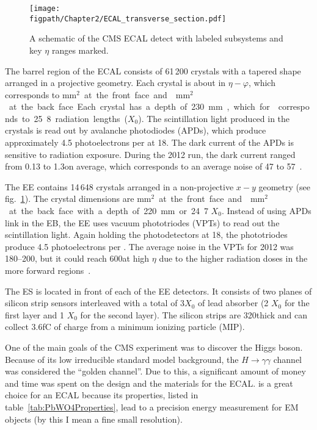 \begin{figure}[!hbt]
    \centering
    \texttt{[image: \\figpath/Chapter2/ECAL\_transverse\_section.pdf]}
    \caption{A schematic of the CMS ECAL detect with labeled subsystems and key $\eta$ ranges marked.}
    \label{fig:CMS_ECAL}
\end{figure}

The barrel region of the ECAL consists of 61\,200 crystals with a tapered shape arranged in a projective geometry. Each crystal is about  in $\eta-\varphi$, which corresponds to \unit{mm$^{\text{2}}$} at the front face and \unit{mm$^{\text{2}}$} at the back face. Each crystal has a depth of 230\mm, which for \PbWO corresponds to 25.8 radiation lengths ($X_{0}$). The scintillation light produced in the crystals is read out by avalanche photodiodes (APDs), which produce approximately 4.5 photoelectrons per \MeVns at 18\degC. The dark current of the APDs is sensitive to radiation exposure. During the 2012 run, the dark current ranged from 0.13 to 1.3\muA on average, which corresponds to an average noise of 47 to 57\mev~\cite{CMS:2013ecal}.

The EE contains 14\,648 \PbWO crystals arranged in a non-projective $x-y$ geometry (see fig.~\ref{fig:CMS_ECAL}). The crystal dimensions are \unit{mm$^{\text{2}}$} at the front face and \unit{mm$^{\text{2}}$} at the back face with a depth of 220\mm or 24.7 $X_{0}$. Instead of using APDs link in the EB, the EE uses vacuum phototriodes (VPTs) to read out the scintillation light. Again holding the photodetectors at 18\degC, the phototriodes produce 4.5 photoelectrons per \MeVns. The average noise in the VPTs for 2012 was 180--200\mev, but it could reach 600\mev at high $\eta$ due to the higher radiation doses in the more forward regions~\cite{CMS:2013ecal}.

The ES is located in front of each of the EE detectors. It consists of two planes of silicon strip sensors interleaved with a total of $3 X_0$ of lead absorber (2 $X_{0}$ for the first layer and 1 $X_{0}$ for the second layer). The silicon strips are 320\mum thick and can collect 3.6\unit{fC} of charge from a minimum ionizing particle (MIP).

One of the main goals of the CMS experiment was to discover the Higgs boson.
Because of its low irreducible standard model background, the $H\rightarrow\gamma\gamma$ channel was considered the ``golden channel''.
Due to this, a significant amount of money and time was spent on the design and the materials for the ECAL.
\PbWO is a great choice for an ECAL because its properties, listed in table~\ref{tab:PbWO4Properties}, lead to a precision energy measurement for EM objects (by this I mean a fine small resolution). 

